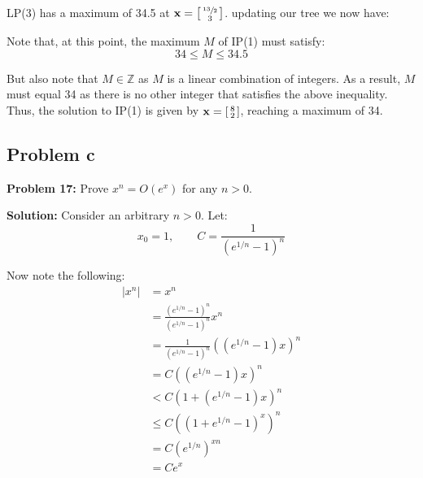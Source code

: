 \documentclass{article}
\newcommand{\icol}[1]{%
  \begin{bsmallmatrix}#1\end{bsmallmatrix}%
}
\renewcommand\vec{\mathbf}
\newcommand{\R}{\mathbb R}
\newcommand{\Z}{\mathbb Z}
\begin{document}
LP(3) has a maximum of 34.5 at $\vec x=\icol{\sfrac{13}{2}\\3}$. updating our tree we now have:
\begin{center}
\end{center}

Note that, at this point, the maximum $M$ of IP(1) must satisfy:
$$34\le M\le 34.5$$

But also note that $M\in\Z$ as $M$ is a linear combination of integers. As a result, $M$ must equal 34 as there is no other integer that satisfies the above inequality. Thus, the solution to IP(1) is given by $\vec x=\icol{8\\2}$, reaching a maximum of 34.

\subsection*{Problem c}

\noindent\textbf{Problem 17:} Prove $x^n = O(e^x)$ for any $n>0$.
\bigskip

\noindent\textbf{Solution:} Consider an arbitrary $n>0$. Let:
$$x_0=1,\qquad C=\frac{1}{(e^{1/n}-1)^n}$$

Now note the following:
\begin{align*}
  |x^n|&=x^n\tag{$x,n>0$}\\
  &=\frac{(e^{1/n}-1)^n}{(e^{1/n}-1)^n}x^n\\
  &=\frac{1}{(e^{1/n}-1)^n}((e^{1/n}-1)x)^n\\
  &=C((e^{1/n}-1)x)^n\tag{def. of $C$}\\
  &<C(1+(e^{1/n}-1)x)^n\\
  &\le C((1+e^{1/n}-1)^x)^n\tag{Bernoulli's inequality}\\
  &=C(e^{1/n})^{xn}\\
  &=Ce^x
\end{align*}
\end{document}
